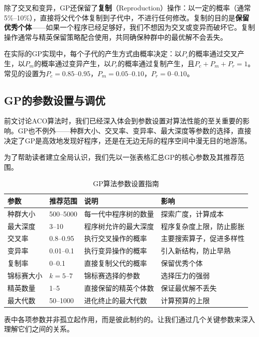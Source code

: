 \documentclass[lang=cn,zihao=-4,a4paper,fontset=windows]{beautybook}
\begin{document}
除了交叉和变异，GP还保留了\textbf{复制}（Reproduction）操作：以一定的概率（通常5\%--10\%），直接将父代个体复制到子代中，不进行任何修改。复制的目的是\textbf{保留优秀个体}——如果一个程序已经足够好，我们不想因为交叉或变异而破坏它。复制操作通常与精英保留策略配合使用，共同确保种群中的最优解不会丢失。

在实际的GP实现中，每个子代的产生方式由概率决定：以$P_c$的概率通过交叉产生，以$P_m$的概率通过变异产生，以$P_r$的概率通过复制产生，且$P_c + P_m + P_r = 1$。常见的设置为$P_c = 0.85$--$0.95$，$P_m = 0.05$--$0.10$，$P_r = 0$--$0.10$。

\subsection{GP的参数设置与调优}

前文讨论ACO算法时，我们已经深入体会到参数设置对算法性能的至关重要的影响。GP也不例外——种群大小、交叉率、变异率、最大深度等参数的选择，直接决定了GP是高效地发现好程序，还是在无边无际的程序空间中漫无目的地游荡。

为了帮助读者建立全局认识，我们先以一张表格汇总GP的核心参数及其推荐范围。

\begin{table}[H]
\centering
\caption{GP算法参数设置指南}
\begin{tabular}{p{}p{}p{}p{}}
\toprule
\textbf{参数} & \textbf{推荐范围} & \textbf{说明} & \textbf{影响} \\
\midrule
种群大小 & 500--5000 & 每一代中程序树的数量 & 探索广度，计算成本 \\
\hline
最大深度 & 3--10 & 程序树允许的最大深度 & 程序复杂度上限，防止膨胀 \\
\hline
交叉率 & 0.8--0.95 & 执行交叉操作的概率 & 主要搜索算子，促进多样性 \\
\hline
变异率 & 0.01--0.1 & 执行变异操作的概率 & 引入新结构，防止早熟 \\
\hline
复制率 & 0--0.1 & 直接复制父代的概率 & 保留优秀个体 \\
\hline
锦标赛大小 & $k=5$--$7$ & 锦标赛选择的参数 & 选择压力的强弱 \\
\hline
精英数量 & 1--5 & 直接保留的精英个体数 & 保证最优解不丢失 \\
\hline
最大代数 & 50--1000 & 进化终止的最大代数 & 计算预算的上限 \\
\bottomrule
\end{tabular}
\end{table}

表中各项参数并非孤立起作用，而是彼此制约的。让我们通过几个关键参数来深入理解它们之间的关系。
\end{document}
